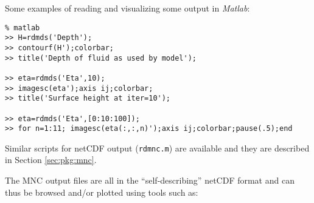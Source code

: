 Some examples of reading and visualizing some output in {\em Matlab}:
\begin{verbatim}
% matlab
>> H=rdmds('Depth');
>> contourf(H');colorbar;
>> title('Depth of fluid as used by model');

>> eta=rdmds('Eta',10);
>> imagesc(eta');axis ij;colorbar;
>> title('Surface height at iter=10');

>> eta=rdmds('Eta',[0:10:100]);
>> for n=1:11; imagesc(eta(:,:,n)');axis ij;colorbar;pause(.5);end
\end{verbatim}

Similar scripts for netCDF output (\texttt{rdmnc.m}) are available and
they are described in Section \ref{sec:pkg:mnc}.

The MNC output files are all in the ``self-describing'' netCDF
format and can thus be browsed and/or plotted using tools such as:
